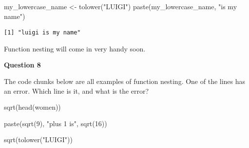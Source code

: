 \documentclass[
  letterpaper,
  DIV=11,
  numbers=noendperiod]{scrreprt}
\newenvironment{Shaded}{\begin{snugshade}}{\end{snugshade}}
\newcommand{\DecValTok}[1]{\textcolor[rgb]{0.68,0.00,0.00}{#1}}
\newcommand{\FunctionTok}[1]{\textcolor[rgb]{0.28,0.35,0.67}{#1}}
\newcommand{\NormalTok}[1]{\textcolor[rgb]{0.00,0.23,0.31}{#1}}
\newcommand{\OtherTok}[1]{\textcolor[rgb]{0.00,0.23,0.31}{#1}}
\newcommand{\StringTok}[1]{\textcolor[rgb]{0.13,0.47,0.30}{#1}}
\begin{document}
\begin{Shaded}
\begin{Highlighting}[]
\NormalTok{my\_lowercase\_name }\OtherTok{\textless{}{-}} \FunctionTok{tolower}\NormalTok{(}\StringTok{"LUIGI"}\NormalTok{)}
\FunctionTok{paste}\NormalTok{(my\_lowercase\_name, }\StringTok{"is my name"}\NormalTok{)}
\end{Highlighting}
\end{Shaded}

\begin{verbatim}
[1] "luigi is my name"
\end{verbatim}

Function nesting will come in very handy soon.

\begin{tcolorbox}[enhanced jigsaw, title=\textcolor{quarto-callout-tip-color}{\faLightbulb}\hspace{0.5em}{Practice}, colbacktitle=quarto-callout-tip-color!10!white, leftrule=.75mm, arc=.35mm, opacityback=0, bottomrule=.15mm, rightrule=.15mm, toptitle=1mm, breakable, toprule=.15mm, colback=white, coltitle=black, colframe=quarto-callout-tip-color-frame, bottomtitle=1mm, titlerule=0mm, left=2mm, opacitybacktitle=0.6]

\textbf{Question 8}

The code chunks below are all examples of function nesting. One of the
lines has an error. Which line is it, and what is the error?

\begin{Shaded}
\begin{Highlighting}[]
\FunctionTok{sqrt}\NormalTok{(}\FunctionTok{head}\NormalTok{(women))}
\end{Highlighting}
\end{Shaded}

\begin{Shaded}
\begin{Highlighting}[]
\FunctionTok{paste}\NormalTok{(}\FunctionTok{sqrt}\NormalTok{(}\DecValTok{9}\NormalTok{), }\StringTok{"plus 1 is"}\NormalTok{, }\FunctionTok{sqrt}\NormalTok{(}\DecValTok{16}\NormalTok{))}
\end{Highlighting}
\end{Shaded}

\begin{Shaded}
\begin{Highlighting}[]
\FunctionTok{sqrt}\NormalTok{(}\FunctionTok{tolower}\NormalTok{(}\StringTok{"LUIGI"}\NormalTok{))}
\end{Highlighting}
\end{Shaded}

\end{tcolorbox}
\end{document}
